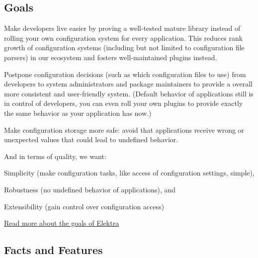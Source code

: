 \subsection*{Goals}


\begin{DoxyItemize}
\item Make developers live easier by proving a well-\/tested mature library instead of rolling your own configuration system for every application. This reduces rank growth of configuration systems (including but not limited to configuration file parsers) in our ecosystem and fosters well-\/maintained plugins instead.
\item Postpone configuration decisions (such as which configuration files to use) from developers to system administrators and package maintainers to provide a overall more consistent and user-\/friendly system. (Default behavior of applications still is in control of developers, you can even roll your own plugins to provide exactly the same behavior as your application has now.)
\item Make configuration storage more safe\+: avoid that applications receive wrong or unexpected values that could lead to undefined behavior.
\end{DoxyItemize}

And in terms of quality, we want\+:


\begin{DoxyEnumerate}
\item Simplicity (make configuration tasks, like access of configuration settings, simple),
\item Robustness (no undefined behavior of applications), and
\item Extensibility (gain control over configuration access)
\end{DoxyEnumerate}

\hyperlink{doc_GOALS_md}{Read more about the goals of Elektra}

\subsection*{Facts and Features}


